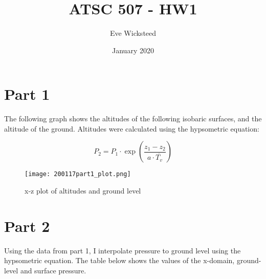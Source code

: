\documentclass[12pt]{article}
\title{ATSC 507 - HW1}
\author{Eve Wicksteed}
\date{January 2020}
\begin{document}
\maketitle

\section*{Part 1}

The following graph shows the altitudes of the following isobaric surfaces, and the altitude of the ground. 
Altitudes were calculated using the hypsometric equation:

$$
P_{2}=P_{1} \cdot \exp \left(\frac{z_{1}-z_{2}}{a \cdot \overline{T_{v}}}\right)
$$


\graphicspath{ {/Users/ewicksteed/Documents/Eve/507/HW1/} }

\begin{figure}[h]
    \centering
    \texttt{[image: 200117part1\_plot.png]}
    \caption{x-z plot of altitudes and ground level}
    \label{fig:mesh1}
\end{figure}


\section*{Part 2}
Using the data from part 1, I interpolate pressure to ground level using the hypsometric equation. 
The table below shows the values of the x-domain, ground-level and surface pressure. 
\end{document}
